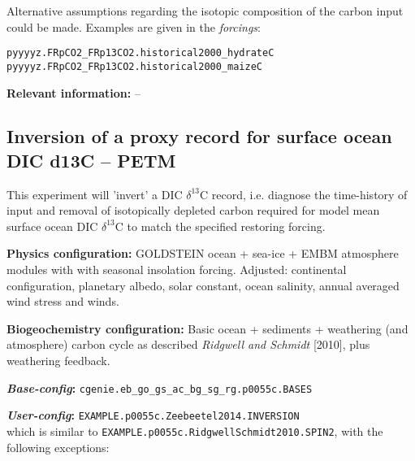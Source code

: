 \documentclass[10pt,twoside]{article}
\begin{document}
Alternative assumptions regarding the isotopic composition of the carbon input could be made. Examples are given in the \textit{forcings}:
\vspace{-5pt}\begin{verbatim}
pyyyyz.FRpCO2_FRp13CO2.historical2000_hydrateC
pyyyyz.FRpCO2_FRp13CO2.historical2000_maizeC
\end{verbatim}\vspace{-5pt}

\noindent \textbf{Relevant information:} --


\subsection{Inversion of a proxy record for surface ocean DIC d13C -- PETM}\label{EXAMPLE.p0055c.Zeebeetel2014.INVERSION}

This experiment will 'invert' a DIC $\delta^{13}$C record, i.e. diagnose the time-history of input and removal of isotopically depleted carbon required for model mean surface ocean DIC $\delta^{13}$C to match the specified restoring forcing.

\noindent \textbf{Physics configuration:} GOLDSTEIN ocean + sea-ice + EMBM atmosphere modules with with seasonal insolation forcing. Adjusted: continental configuration, planetary albedo, solar constant, ocean salinity, annual averaged wind stress and winds.

\noindent \textbf{Biogeochemistry configuration:} Basic ocean + sediments + weathering (and atmosphere) carbon cycle as described \textit{Ridgwell and Schmidt} [2010], plus weathering feedback.

\noindent \textbf{\textit{Base-config}:} \texttt{cgenie.eb\_go\_gs\_ac\_bg\_sg\_rg.p0055c.BASES}

\noindent \textbf{\textit{User-config}:} \texttt{EXAMPLE.p0055c.Zeebeetel2014.INVERSION} 
\\which is similar to \texttt{EXAMPLE.p0055c.RidgwellSchmidt2010.SPIN2}, with the following exceptions:
\end{document}
